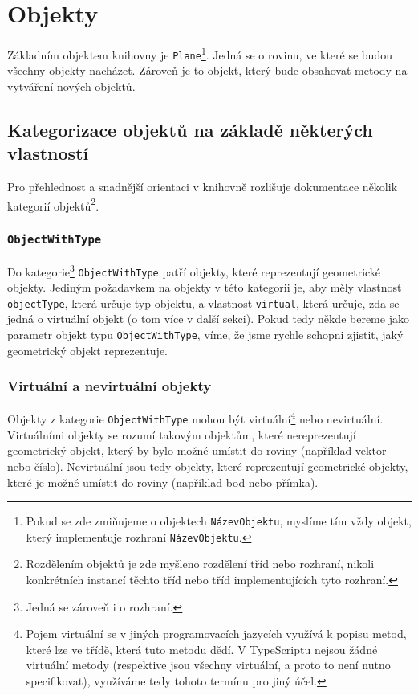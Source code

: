 \chapter{Objekty}
\label{chapter:objects}

Základním objektem knihovny je \texttt{Plane}\footnote{Pokud se zde zmiňujeme o objektech \texttt{NázevObjektu}, myslíme tím vždy objekt, který implementuje rozhraní \texttt{NázevObjektu}.}\cite{geometryjs:source:interfaces:plane.ts}. 
Jedná se o rovinu, ve které se budou všechny objekty nacházet.
Zároveň je to objekt, který bude obsahovat metody na vytváření nových objektů\cite{geometryjs:wiki:geometryObjects}.

\section[Kategorizace]{Kategorizace objektů na základě některých vlastností}
\label{sec:object-categorization}

Pro přehlednost a snadnější orientaci v knihovně rozlišuje dokumentace několik kategorií objektů\footnote{Rozdělením objektů je zde myšleno rozdělení tříd nebo rozhraní, nikoli konkrétních instancí těchto tříd nebo tříd implementujících tyto rozhraní.}\cite{geometryjs:wiki:geometryObjects}.

\subsection[ObjectWithType]{\texttt{ObjectWithType}}
\label{subsec:object-with-type}

Do kategorie\footnote{Jedná se zároveň i o rozhraní.} \texttt{ObjectWithType} patří objekty, které reprezentují geometrické objekty. 
Jediným požadavkem na objekty v této kategorii je, aby měly vlastnost \texttt{objectType}, která určuje typ objektu, a vlastnost \texttt{virtual}, která určuje, zda se jedná o virtuální objekt (o tom více v další sekci).
Pokud tedy někde bereme jako parametr objekt typu \texttt{ObjectWithType}, víme, že jsme rychle schopni zjistit, jaký geometrický objekt reprezentuje.\cite[volný překlad]{geometryjs:wiki:geometryObjects}

\subsection[Virtuální a nevirtuální]{Virtuální a nevirtuální objekty}
\label{subsec:virtual-and-non-virtual}

Objekty z kategorie \texttt{ObjectWithType} mohou být virtuální\footnote{Pojem virtuální se v jiných programovacích jazycích využívá k popisu metod, které lze  ve třídě, která tuto metodu dědí. V TypeScriptu nejsou žádné virtuální metody (respektive jsou všechny virtuální, a proto to není nutno specifikovat), využíváme tedy tohoto termínu pro jiný účel.} nebo nevirtuální.
Virtuálními objekty se rozumí takovým objektům, které nereprezentují geometrický objekt, který by bylo možné umístit do roviny (například vektor nebo číslo).
Nevirtuální jsou tedy objekty, které reprezentují geometrické objekty, které je možné umístit do roviny (například bod nebo přímka).\cite[volný překlad]{geometryjs:wiki:geometryObjects}

